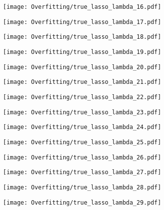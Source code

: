 \documentclass[xcolor=pdftex,dvipsnames,table]{beamer}
\begin{document}
\frame
{
	\begin{center}
		\texttt{[image: Overfitting/true\_lasso\_lambda\_16.pdf]}
	\end{center}
}
\frame
{
	\begin{center}
		\texttt{[image: Overfitting/true\_lasso\_lambda\_17.pdf]}
	\end{center}
}
\frame
{
	\begin{center}
		\texttt{[image: Overfitting/true\_lasso\_lambda\_18.pdf]}
	\end{center}
}
\frame
{
	\begin{center}
		\texttt{[image: Overfitting/true\_lasso\_lambda\_19.pdf]}
	\end{center}
}
\frame
{
	\begin{center}
		\texttt{[image: Overfitting/true\_lasso\_lambda\_20.pdf]}
	\end{center}
}
\frame
{
	\begin{center}
		\texttt{[image: Overfitting/true\_lasso\_lambda\_21.pdf]}
	\end{center}
}
\frame
{
	\begin{center}
		\texttt{[image: Overfitting/true\_lasso\_lambda\_22.pdf]}
	\end{center}
}
\frame
{
	\begin{center}
		\texttt{[image: Overfitting/true\_lasso\_lambda\_23.pdf]}
	\end{center}
}
\frame
{
	\begin{center}
		\texttt{[image: Overfitting/true\_lasso\_lambda\_24.pdf]}
	\end{center}
}
\frame
{
	\begin{center}
		\texttt{[image: Overfitting/true\_lasso\_lambda\_25.pdf]}
	\end{center}
}
\frame
{
	\begin{center}
		\texttt{[image: Overfitting/true\_lasso\_lambda\_26.pdf]}
	\end{center}
}
\frame
{
	\begin{center}
		\texttt{[image: Overfitting/true\_lasso\_lambda\_27.pdf]}
	\end{center}
}
\frame
{
	\begin{center}
		\texttt{[image: Overfitting/true\_lasso\_lambda\_28.pdf]}
	\end{center}
}
\frame
{
	\begin{center}
		\texttt{[image: Overfitting/true\_lasso\_lambda\_29.pdf]}
	\end{center}
}
\end{document}
